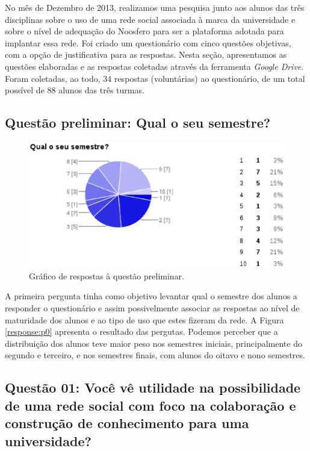 No mês de Dezembro de 2013, realizamos uma pesquisa junto aos alunos das três
disciplinas sobre o uso de uma rede social associada à marca da universidade
e sobre o nível de adequação do Noosfero para ser a plataforma adotada para
implantar essa rede.
%
Foi criado um questionário com cinco questões objetivas, com a opção de
justificativa para as respostas.
%
Nesta seção, apresentamos as questões elaboradas e as respostas coletadas
através da ferramenta \textit{Google Drive}. Foram coletadas, ao todo,
34 respostas (voluntárias) ao questionário, de um total possível de 88 alunos
das três turmas.

\subsection*{Questão preliminar: Qual o seu semestre?}

\begin{figure}[h!]
    \centering
    \includegraphics[keepaspectratio=true,scale=0.6]
      {figuras/p0.eps}
    \caption{Gráfico de respostas à questão preliminar.}
    \label{response:0}
\end{figure}

A primeira pergunta tinha como objetivo levantar qual o semestre dos alunos
a responder o questionário e assim possivelmente associar as respostas
ao nível de maturidade dos alunos e ao tipo de uso que estes fizeram da rede.
%
A Figura \ref{response:p0} apresenta o resultado das pergutas. Podemos perceber
que a distribuição dos alunos teve maior peso nos semestres iniciais,
principalmente do segundo e terceiro, e nos semestres finais, com alunos
do oitavo e nono semestres.

\subsection*{Questão 01: Você vê utilidade na possibilidade de uma rede social
com foco na colaboração e construção de conhecimento para uma universidade?}

